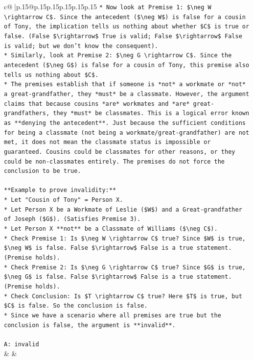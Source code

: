 \documentclass{article}
\begin{document}
{\begin{supertabular}{c@{$\;$}|p{.15\linewidth}@{}p{.15\linewidth}p{.15\linewidth}p{.15\linewidth}p{.15\linewidth}p{.15\linewidth}}
{{{\texttt{*   Now look at Premise 1: \$\textbackslash{}neg W \textbackslash{}rightarrow C\$. Since the antecedent (\$\textbackslash{}neg W\$) is false for a cousin of Tony, the implication tells us nothing about whether \$C\$ is true or false. (False \$\textbackslash{}rightarrow\$ True is valid; False \$\textbackslash{}rightarrow\$ False is valid; but we don't know the consequent).} \\
\texttt{*   Similarly, look at Premise 2: \$\textbackslash{}neg G \textbackslash{}rightarrow C\$. Since the antecedent (\$\textbackslash{}neg G\$) is false for a cousin of Tony, this premise also tells us nothing about \$C\$.} \\
\texttt{*   The premises establish that if someone is *not* a workmate or *not* a great{-}grandfather, they *must* be a classmate. However, the argument claims that because cousins *are* workmates and *are* great{-}grandfathers, they *must* be classmates. This is a logical error known as **denying the antecedent**. Just because the sufficient conditions for being a classmate (not being a workmate/great{-}grandfather) are not met, it does not mean the classmate status is impossible or guaranteed. Cousins could be classmates for other reasons, or they could be non{-}classmates entirely. The premises do not force the conclusion to be true.} \\
\\ 
\texttt{**Example to prove invalidity:**} \\
\texttt{*   Let "Cousin of Tony" = Person X.} \\
\texttt{*   Let Person X be a Workmate of Leslie (\$W\$) and a Great{-}grandfather of Joseph (\$G\$). (Satisfies Premise 3).} \\
\texttt{*   Let Person X **not** be a Classmate of Williams (\$\textbackslash{}neg C\$).} \\
\texttt{*   Check Premise 1: Is \$\textbackslash{}neg W \textbackslash{}rightarrow C\$ true? Since \$W\$ is true, \$\textbackslash{}neg W\$ is false. False \$\textbackslash{}rightarrow\$ False is a true statement. (Premise holds).} \\
\texttt{*   Check Premise 2: Is \$\textbackslash{}neg G \textbackslash{}rightarrow C\$ true? Since \$G\$ is true, \$\textbackslash{}neg G\$ is false. False \$\textbackslash{}rightarrow\$ False is a true statement. (Premise holds).} \\
\texttt{*   Check Conclusion: Is \$T \textbackslash{}rightarrow C\$ true? Here \$T\$ is true, but \$C\$ is false. So the conclusion is false.} \\
\texttt{*   Since we have a scenario where all premises are true but the conclusion is false, the argument is **invalid**.} \\
\\ 
\texttt{A: invalid} \\
            }
        }
    }
    & & \\ \\


\end{supertabular}}
\end{document}
